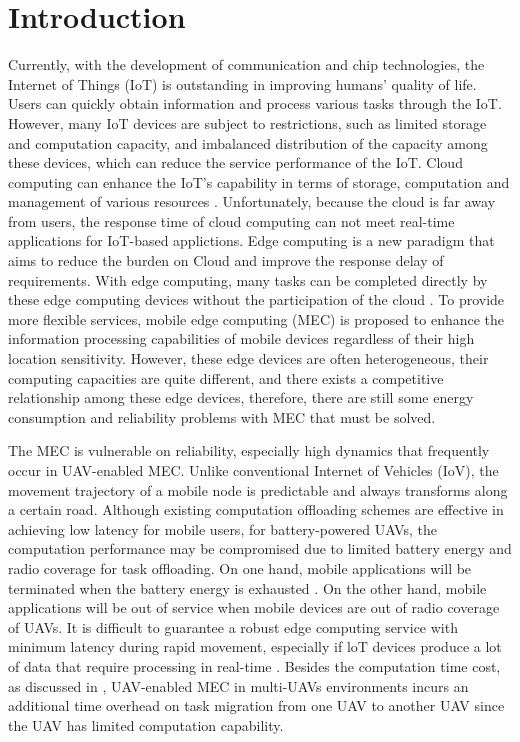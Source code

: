 \documentclass[journal,article,submit,pdftex,moreauthors]{Definitions/mdpi}
\begin{document}
\setcounter{section}{-1} %
\section{Introduction}

Currently, with the development of communication and chip technologies, the Internet of Things (IoT) is outstanding in improving humans' quality of life. Users can quickly obtain information and process various tasks through the IoT. However, many IoT devices are subject to restrictions, such as limited storage and computation capacity, and imbalanced distribution of the capacity among these devices, which can reduce the service performance of the IoT. Cloud computing can enhance the IoT's capability in terms of storage, computation and management of various resources \cite{Shenshihao20,Salaht20,ShiWeisong16}. Unfortunately, because the cloud is far away from users, the response time of cloud computing can not meet real-time applications for IoT-based applictions. Edge computing is a new paradigm that aims to reduce the burden on Cloud and improve the response delay of requirements. With edge computing, many tasks can be completed directly by these edge computing devices without the participation of the cloud \cite{Liuyaqiong20}. To provide more flexible services, mobile edge computing (MEC) is proposed to enhance the information processing capabilities of mobile devices regardless of their high location sensitivity. However, these edge devices are often heterogeneous, their computing capacities are quite different, and there exists a competitive relationship among these edge devices, therefore, there are still some energy consumption and reliability problems with MEC that must be solved.

The MEC is vulnerable on reliability, especially high dynamics that frequently occur in UAV-enabled MEC. Unlike conventional Internet of Vehicles (IoV), the movement trajectory of a mobile node is predictable and always transforms along a certain road. Although existing computation offloading schemes are effective in achieving low latency for mobile users, for battery-powered UAVs, the computation performance may be compromised due to limited battery energy and radio coverage for task offloading. On one hand, mobile applications will be terminated when the battery energy is exhausted \cite{YuyiMao2016}. On the other hand, mobile applications will be out of service when mobile devices are out of radio coverage of UAVs. It is difficult to guarantee a robust edge computing service with minimum latency during rapid movement, especially if loT devices produce a lot of data that require processing in real-time \cite{Faraci20}. Besides the computation time cost, as discussed in \cite{XuY21,WangH19,ZhanC19,ZengY18}, UAV-enabled MEC in multi-UAVs environments incurs an additional time overhead on task migration from one UAV to another UAV since the UAV has limited computation capability. 
\end{document}
